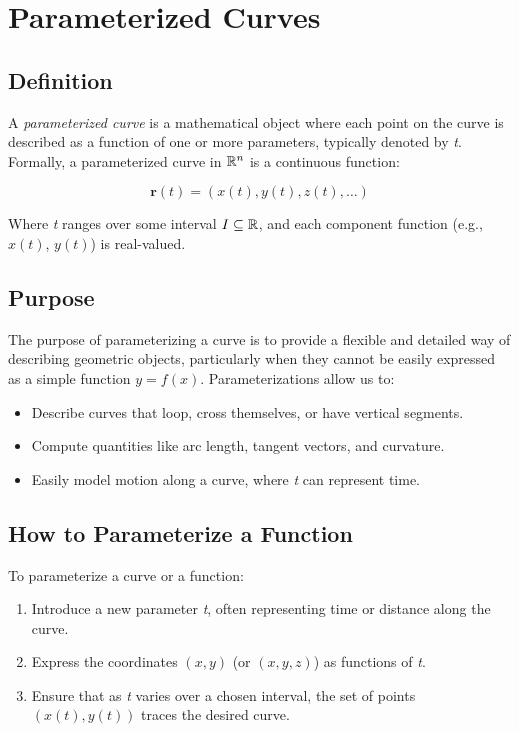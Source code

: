 \newpage
\section{Parameterized Curves}

\subsection{Definition}

A \emph{parameterized curve} is a mathematical object where each point on the curve is described as a 
function of one or more parameters, typically denoted by \emph{t}. Formally, a parameterized curve in 
\( \mathbb{R}^n \) is a continuous function:

\[
    \mathbf{r}(t) = (x(t), y(t), z(t), \ldots)
\]

Where \emph{t} ranges over some interval \( I \subseteq \mathbb{R} \), and each component function 
(e.g., \( x(t) \), \( y(t) \)) is real-valued.

\subsection{Purpose}

The purpose of parameterizing a curve is to provide a flexible and detailed way of describing geometric 
objects, particularly when they cannot be easily expressed as a simple function \( y = f(x) \). 
Parameterizations allow us to:

\begin{itemize}

    \item Describe curves that loop, cross themselves, or have vertical segments.

    \item Compute quantities like arc length, tangent vectors, and curvature.

    \item Easily model motion along a curve, where \emph{t} can represent time.

\end{itemize}

\subsection{How to Parameterize a Function}

To parameterize a curve or a function:

\begin{enumerate}

    \item Introduce a new parameter \emph{t}, often representing time or distance along the curve.

    \item Express the coordinates \( (x, y) \) (or \( (x, y, z) \)) as functions of \emph{t}.


    \item Ensure that as \emph{t} varies over a chosen interval, the set of points \( (x(t), y(t)) \) 
         traces the desired curve.

\end{enumerate}

